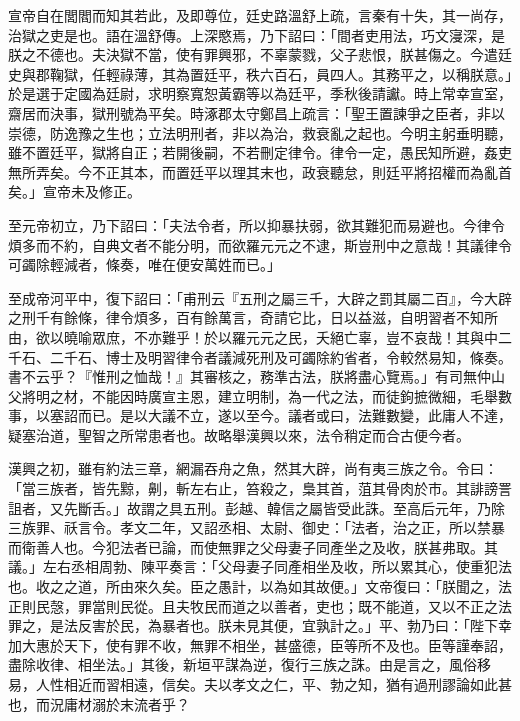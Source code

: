 \begin{pinyinscope}
宣帝自在閭閻而知其若此，及即尊位，廷史路溫舒上疏，言秦有十失，其一尚存，治獄之吏是也。語在溫舒傳。上深愍焉，乃下詔曰：「間者吏用法，巧文寖深，是朕之不德也。夫決獄不當，使有罪興邪，不辜蒙戮，父子悲恨，朕甚傷之。今遣廷史與郡鞠獄，任輕祿薄，其為置廷平，秩六百石，員四人。其務平之，以稱朕意。」於是選于定國為廷尉，求明察寬恕黃霸等以為廷平，季秋後請讞。時上常幸宣室，齋居而決事，獄刑號為平矣。時涿郡太守鄭昌上疏言：「聖王置諫爭之臣者，非以崇德，防逸豫之生也；立法明刑者，非以為治，救衰亂之起也。今明主躬垂明聽，雖不置廷平，獄將自正；若開後嗣，不若刪定律令。律令一定，愚民知所避，姦吏無所弄矣。今不正其本，而置廷平以理其末也，政衰聽怠，則廷平將招權而為亂首矣。」宣帝未及修正。

至元帝初立，乃下詔曰：「夫法令者，所以抑暴扶弱，欲其難犯而易避也。今律令煩多而不約，自典文者不能分明，而欲羅元元之不逮，斯豈刑中之意哉！其議律令可蠲除輕減者，條奏，唯在便安萬姓而已。」

至成帝河平中，復下詔曰：「甫刑云『五刑之屬三千，大辟之罰其屬二百』，今大辟之刑千有餘條，律令煩多，百有餘萬言，奇請它比，日以益滋，自明習者不知所由，欲以曉喻眾庶，不亦難乎！於以羅元元之民，夭絕亡辜，豈不哀哉！其與中二千石、二千石、博士及明習律令者議減死刑及可蠲除約省者，令較然易知，條奏。書不云乎？『惟刑之恤哉！』其審核之，務準古法，朕將盡心覽焉。」有司無仲山父將明之材，不能因時廣宣主恩，建立明制，為一代之法，而徒鉤摭微細，毛舉數事，以塞詔而已。是以大議不立，遂以至今。議者或曰，法難數變，此庸人不達，疑塞治道，聖智之所常患者也。故略舉漢興以來，法令稍定而合古便今者。

漢興之初，雖有約法三章，網漏吞舟之魚，然其大辟，尚有夷三族之令。令曰：「當三族者，皆先黥，劓，斬左右止，笞殺之，梟其首，菹其骨肉於市。其誹謗詈詛者，又先斷舌。」故謂之具五刑。彭越、韓信之屬皆受此誅。至高后元年，乃除三族罪、祅言令。孝文二年，又詔丞相、太尉、御史：「法者，治之正，所以禁暴而衛善人也。今犯法者已論，而使無罪之父母妻子同產坐之及收，朕甚弗取。其議。」左右丞相周勃、陳平奏言：「父母妻子同產相坐及收，所以累其心，使重犯法也。收之之道，所由來久矣。臣之愚計，以為如其故便。」文帝復曰：「朕聞之，法正則民愨，罪當則民從。且夫牧民而道之以善者，吏也；既不能道，又以不正之法罪之，是法反害於民，為暴者也。朕未見其便，宜孰計之。」平、勃乃曰：「陛下幸加大惠於天下，使有罪不收，無罪不相坐，甚盛德，臣等所不及也。臣等謹奉詔，盡除收律、相坐法。」其後，新垣平謀為逆，復行三族之誅。由是言之，風俗移易，人性相近而習相遠，信矣。夫以孝文之仁，平、勃之知，猶有過刑謬論如此甚也，而況庸材溺於末流者乎？


\end{pinyinscope}
